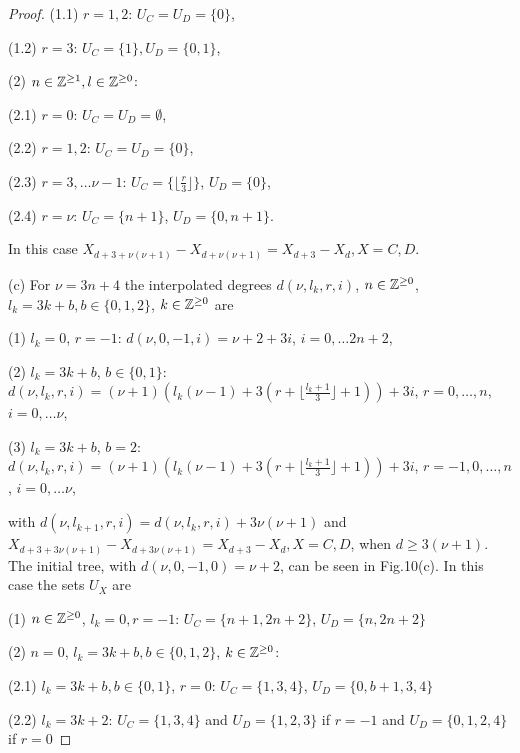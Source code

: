 \documentclass{birkjour_t2}
\theoremstyle{definition}
\theoremstyle{remark}
\numberwithin{equation}{section}
\begin{document}
\begin{proof}
    (1.1) $r=1, 2$: $U_{C}= U_{D}=\{ 0 \}$,
    
     (1.2) $r=3$: $U_{C}=\{ 1 \}, U_{D}=\{ 0,1 \}$,
    
     (2)  $n \in {\Bbb{Z}}^{\geq 1}, l \in {\Bbb{Z}}^{\geq 0}$: 
     
     (2.1) $r=0$: $U_{C}= U_{D}=\emptyset$,
    
 (2.2) $r=1, 2$: $U_{C}= U_{D}=\{0\}$, 
 
 (2.3) $r=3, \dots \nu-1$: $U_{C}=\{ \lfloor \frac{r}{3}  \rfloor\}$,  $U_{D}=\{0\}$,
 
 (2.4) $r=\nu$: $U_{C}=\{ n+1 \}$,  $U_{D}=\{0, n+1\}$.
    \bigskip\par 
In this case $X_{d+3+ \nu(\nu+1)}- X_{d+ \nu(\nu+1)} = X_{d+3}- X_{d}, X=C, D$. 

  \bigskip\par
(c) For $\nu= 3n+4$ the interpolated degrees $d(\nu, l_{k}, r, i)$, $n \in {\Bbb{Z}}^{\geq 0}$, $l_{k}=3k+b, b\in \{ 0, 1, 2 \}$, $k \in {\Bbb{Z}}^{\geq 0}$ are 
      \bigskip\par 
  (1) $l_{k}=0$, $r=-1$: $d(\nu, 0, -1, i)=\nu+2+3i$,  $i=0,\dots 2n+2$,
  
   (2) $l_{k}=3k+b$, $b\in \{ 0, 1 \}$: $d(\nu, l_{k}, r, i)=(\nu +1)(l_{k} (\nu-1)+3(r+\lfloor\frac{l_{k}+1}{3}\rfloor +1))+ 3i$, $r = 0, \dots, n$, $i=0,\dots \nu$,
   
     (3) $l_{k}=3k+b$, $b=2$: $d(\nu, l_{k}, r, i)=(\nu +1)(l_{k} (\nu-1)+3(r+\lfloor\frac{l_{k}+1}{3}\rfloor +1))+ 3i$, $r = -1, 0, \dots, n$, $i=0,\dots \nu$,

       \bigskip\par 
  \noindent            
 with  $d(\nu, l_{k+1}, r, i)=d(\nu, l_{k}, r, i)+ 3\nu(\nu+1)$ and $X_{d+3+3 \nu(\nu+1)}- X_{d+3 \nu(\nu+1)} = X_{d+3}- X_{d}, X=C, D$, when $d \geq 3(\nu+1)$. The initial tree, with $d(\nu, 0, -1, 0)=\nu+2$, can be seen in Fig.10(c). In this case the sets $U_{X}$ are  
       \bigskip\par 
 (1) $n \in {\Bbb{Z}}^{\geq 0}$, $ l_{k}=0, r=-1$:   $U_{C}=\{n+1, 2n+2\}$,  $U_{D}=\{n, 2n+2\}$ 
 
 (2) $n=0$,  $l_{k}=3k+b, b\in \{ 0, 1, 2 \}$, $k \in {\Bbb{Z}}^{\geq 0}$: 
 
  (2.1) $l_{k}=3k+b, b\in \{ 0, 1\}$, $r=0$: $U_{C}=\{1, 3, 4\}$, $U_{D}=\{0, b+1, 3, 4\}$ 
  
   (2.2) $l_{k}=3k+2$: $U_{C}=\{1, 3, 4\}$ and $U_{D}=\{1, 2, 3\}$ if $r = -1$ and $U_{D}=\{0, 1, 2, 4\}$ if $r = 0$
 

\end{proof}
\end{document}
